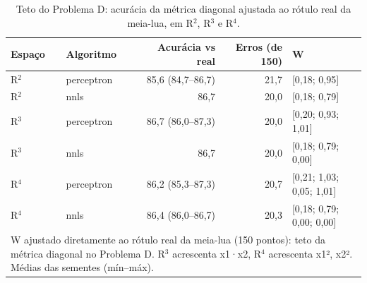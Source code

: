 \begin{table}[htbp]
\centering
\small
\caption{Teto do Problema D: acurácia da métrica diagonal ajustada ao rótulo real da meia-lua, em R$^2$, R$^3$ e R$^4$.}
\label{tab:bloco1_D_teto_oraculo_meialua}
\begin{tabular}{llrrl}
\toprule
Espaço & Algoritmo & Acurácia vs real & Erros (de 150) & W \\
\midrule
R$^2$ & perceptron & 85,6 (84,7–86,7) & 21,7 & [0,18; 0,95] \\
R$^2$ & nnls & 86,7 & 20,0 & [0,18; 0,79] \\
R$^3$ & perceptron & 86,7 (86,0–87,3) & 20,0 & [0,20; 0,93; 1,01] \\
R$^3$ & nnls & 86,7 & 20,0 & [0,18; 0,79; 0,00] \\
R$^4$ & perceptron & 86,2 (85,3–87,3) & 20,7 & [0,21; 1,03; 0,05; 1,01] \\
R$^4$ & nnls & 86,4 (86,0–86,7) & 20,3 & [0,18; 0,79; 0,00; 0,00] \\
\bottomrule
\multicolumn{5}{p{0.95\linewidth}}{\footnotesize W ajustado diretamente ao rótulo real da meia-lua (150 pontos): teto da métrica diagonal no Problema D. R$^3$ acrescenta x1·x2, R$^4$ acrescenta x1², x2². Médias das sementes (mín–máx).} \\
\end{tabular}
\end{table}
